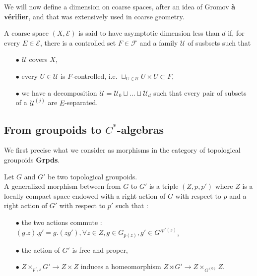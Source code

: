 We will now define a dimension on coarse spaces, after an idea of Gromov \textbf{à vérifier}, and that was extensively used in coarse geometry.\\

\begin{definition}
A coarse space $(X,\mathcal E)$ is said to have asymptotic dimension less than $d$ if, for every $E\in \mathcal E$, there is a controlled set $F\in\mathcal F$ and a family $\mathcal U$ of susbsets such that 
\begin{itemize}
\item[$\bullet$] $\mathcal U$ covers $X$,
\item[$\bullet$] every $U\in \mathcal U$ is $F$-controlled, i.e. $\sqcup_{U \in \mathcal U} U\times U \subset F$,
\item[$\bullet$] we have a decomposition $\mathcal U = \mathcal U_0 \sqcup ... \sqcup \mathcal U_d$ such that every pair of subsets of a $\mathcal U^{(j)}$ are $E$-separated.
\end{itemize}
\end{definition}

\subsection{From groupoids to $C^*$-algebras}

We first precise what we consider as morphisms in the category of topological groupoids \textbf{Grpds}.\\

\begin{definition}
Let $G$ and $G'$ be two topological groupoids.\\ 
A generalized morphism between from $G$ to $G'$ is a triple $(Z,p,p')$ where $Z$ is a locally compact space endowed with a right action of $G$ with respect to $p$ and a right action of $G'$ with respect to $p'$ such that :
\begin{itemize}
\item[$\bullet$] the two actions commute : $(g.z).g'=g.(zg'),\forall z\in Z,g\in G_{p(z)},g'\in G'^{p'(z)}$,
\item[$\bullet$] the action of $G'$ is free and proper,
\item[$\bullet$] $Z\times_{p',s} G'\rightarrow Z\times Z $ induces a homeomorphism $Z\rtimes G' \rightarrow Z\times_{G^{(0)}} Z$.\\
\end{itemize}
\end{definition}

